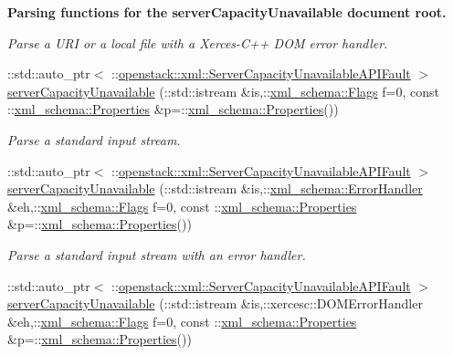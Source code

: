 \begin{Indent}{\bf Parsing functions for the serverCapacityUnavailable document root.}
\begin{DoxyCompactItemize}
\begin{DoxyCompactList}\small\item\em Parse a URI or a local file with a Xerces-\/C++ DOM error handler. \item\end{DoxyCompactList}\item 
::std::auto\_\-ptr$<$ ::\hyperlink{classopenstack_1_1xml_1_1ServerCapacityUnavailableAPIFault}{openstack::xml::ServerCapacityUnavailableAPIFault} $>$ \hyperlink{namespaceopenstack_1_1xml_a27328edbe0e65983e93d7ec7f995a69c}{serverCapacityUnavailable} (::std::istream \&is,::\hyperlink{namespacexml__schema_affb4c227cbd9aa7453dd1dc5a1401943}{xml\_\-schema::Flags} f=0, const ::\hyperlink{namespacexml__schema_ad27ce19a7ee1d3b1064092648898f64c}{xml\_\-schema::Properties} \&p=::\hyperlink{namespacexml__schema_ad27ce19a7ee1d3b1064092648898f64c}{xml\_\-schema::Properties}())
\begin{DoxyCompactList}\small\item\em Parse a standard input stream. \item\end{DoxyCompactList}\item 
::std::auto\_\-ptr$<$ ::\hyperlink{classopenstack_1_1xml_1_1ServerCapacityUnavailableAPIFault}{openstack::xml::ServerCapacityUnavailableAPIFault} $>$ \hyperlink{namespaceopenstack_1_1xml_a79593b8596484aef4d62c49b1a38c6dc}{serverCapacityUnavailable} (::std::istream \&is,::\hyperlink{namespacexml__schema_ab1c9361bfd3b404eaabf0c31eded79dc}{xml\_\-schema::ErrorHandler} \&eh,::\hyperlink{namespacexml__schema_affb4c227cbd9aa7453dd1dc5a1401943}{xml\_\-schema::Flags} f=0, const ::\hyperlink{namespacexml__schema_ad27ce19a7ee1d3b1064092648898f64c}{xml\_\-schema::Properties} \&p=::\hyperlink{namespacexml__schema_ad27ce19a7ee1d3b1064092648898f64c}{xml\_\-schema::Properties}())
\begin{DoxyCompactList}\small\item\em Parse a standard input stream with an error handler. \item\end{DoxyCompactList}\item 
::std::auto\_\-ptr$<$ ::\hyperlink{classopenstack_1_1xml_1_1ServerCapacityUnavailableAPIFault}{openstack::xml::ServerCapacityUnavailableAPIFault} $>$ \hyperlink{namespaceopenstack_1_1xml_a777ac0617dea8d9cb816e76d43a4e75e}{serverCapacityUnavailable} (::std::istream \&is,::xercesc::DOMErrorHandler \&eh,::\hyperlink{namespacexml__schema_affb4c227cbd9aa7453dd1dc5a1401943}{xml\_\-schema::Flags} f=0, const ::\hyperlink{namespacexml__schema_ad27ce19a7ee1d3b1064092648898f64c}{xml\_\-schema::Properties} \&p=::\hyperlink{namespacexml__schema_ad27ce19a7ee1d3b1064092648898f64c}{xml\_\-schema::Properties}())

\end{DoxyCompactItemize}
\end{Indent}

